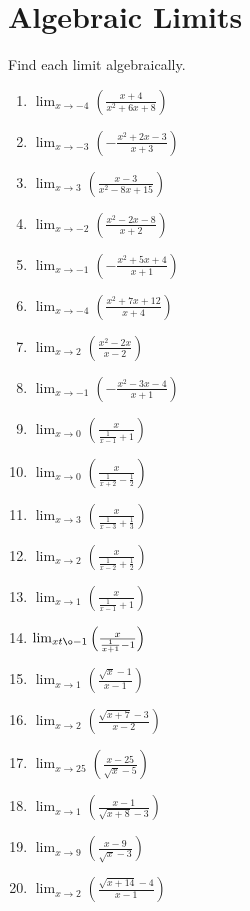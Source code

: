 \chapter{Algebraic Limits}

Find each limit algebraically.

\begin{multicols}{2}
\begin{enumerate}
	\item $\lim_{x \to -4} \left(\frac{x+4}{x^2+6x+8}\right)$
	\item $\lim_{x \to -3} \left(-\frac{x^2+2x-3}{x+3}\right)$
	\item $\lim_{x \to 3} \left(\frac{x-3}{x^2-8x+15}\right)$
	\item $\lim_{x \to -2} \left(\frac{x^2-2x-8}{x+2}\right)$
	\item $\lim_{x \to -1} \left(-\frac{x^2+5x+4}{x+1}\right)$
	\item $\lim_{x \to -4} \left(\frac{x^2+7x+12}{x+4}\right)$
	\item $\lim_{x \to 2} \left(\frac{x^2-2x}{x-2}\right)$
	\item $\lim_{x \to -1} \left(-\frac{x^2-3x-4}{x+1}\right)$
	
	\item $\lim_{x \to 0} \left(\frac{x}{\frac{1}{x-1}+1}\right)$
	\item $\lim_{x \to 0} \left(\frac{x}{\frac{1}{x+2}-\frac{1}{2}}\right)$
	\item $\lim_{x \to 3} \left(\frac{x}{\frac{1}{x-3}+\frac{1}{3}}\right)$
	\item $\lim_{x \to 2} \left(\frac{x}{\frac{1}{x-2}+\frac{1}{2}}\right)$
	\item $\lim_{x \to 1} \left(\frac{x}{\frac{1}{x-1}+1}\right)$
	\item $\lim_{x t\o -1} \left(\frac{x}{\frac{1}{x+1}-1}\right)$
	
	\item $\lim_{x \to 1} \left(\frac{\sqrt{x}-1}{x-1}\right)$
	\item $\lim_{x \to 2} \left(\frac{\sqrt{x+7}-3}{x-2}\right)$
	\item $\lim_{x \to 25} \left(\frac{x-25}{\sqrt{x}-5}\right)$
	\item $\lim_{x \to 1} \left(\frac{x-1}{\sqrt{x+8}-3}\right)$
	\item $\lim_{x \to 9} \left(\frac{x-9}{\sqrt{x}-3}\right)$
	\item $\lim_{x \to 2} \left(\frac{\sqrt{x+14}-4}{x-1}\right)$
\end{enumerate}
\end{multicols}

